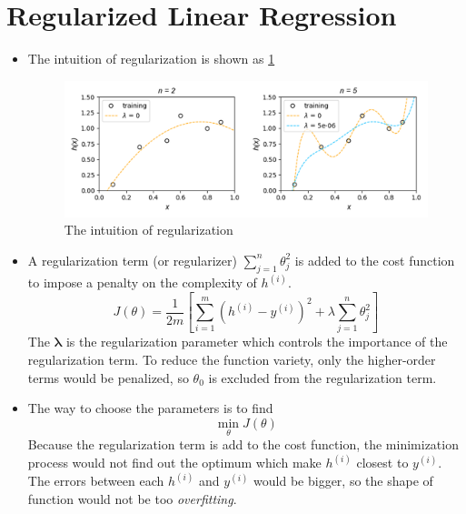 \section{Regularized Linear Regression}
\begin{itemize}
    \item The intuition of regularization is shown as \ref{fig:intuitionRegularization}
    \begin{figure}[H]\label{fig:intuitionRegularization}
        \centering
        \includegraphics[width=5.4in]{./images/intuitionRegularization.png}
        \caption{The intuition of regularization}
    \end{figure}
    
    \item A regularization term (or regularizer) $\sum_{j=1}^{n}{\theta_j^2}$ is added to the cost function to impose a penalty on the complexity of $h^{(i)}$.
    \begin{equation}\label{eqn:regularCostLinear}
        J(\theta) = \frac{1}{2m} \left[ \sum_{i=1}^{m} { (h^{(i)} - y^{(i)})^2} + \lambda \sum_{j=1}^{n}{\theta_j^2} \right]
    \end{equation}
    The $\mathbf{\lambda}$ is the regularization parameter which controls the importance of the regularization term.
    To reduce the function variety, only the higher-order terms would be penalized, so $\theta_0$ is excluded from the regularization term.

    \item The way to choose the parameters is to find \begin{equation} \min_{\theta}{J\left(\theta\right)} \end{equation}
    Because the regularization term is add to the cost function, the minimization process would not find out the optimum which make $h^{(i)}$ closest to $y^{(i)}$.
    The errors between each $h^{(i)}$ and $y^{(i)}$ would be bigger, so the shape of function would not be too \emph{overfitting}.


\end{itemize}

